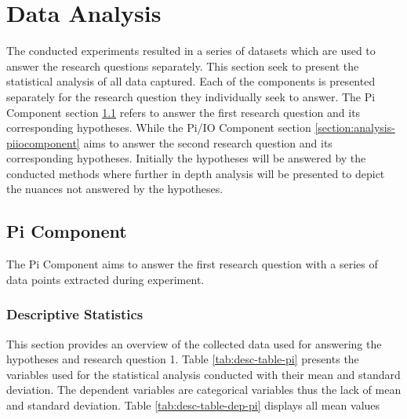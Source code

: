 \iffalse  \fi
\chapter{Data Analysis}

The conducted experiments resulted in a series of datasets which are used to answer the research questions separately. This section seek to present the statistical analysis of all data captured. Each of the components is presented separately for the research question they individually seek to answer. The Pi Component section \ref{section:analysis-picomponent} refers to answer the first research question and its corresponding hypotheses. While the Pi/IO Component section \ref{section:analysis-piiocomponent} aims to answer the second research question and its corresponding hypotheses. Initially the hypotheses will be answered by the conducted methods where further in depth analysis will be presented to depict the nuances not answered by the hypotheses.


\section{Pi Component}
\label{section:analysis-picomponent}

The Pi Component aims to answer the first research question with a series of data points extracted during experiment.


\subsection{Descriptive Statistics}

This section provides an overview of the collected data used for answering the hypotheses and research question 1. Table \ref{tab:desc-table-pi} presents the variables used for the statistical analysis conducted with their mean and standard deviation. The dependent variables are categorical variables thus the lack of mean and standard deviation. Table \ref{tab:desc-table-dep-pi} displays all mean values 


